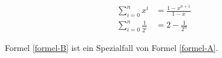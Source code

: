 \begin{align}
	\sum_{i=0}^{n} x^i &= \frac{1-x^{n+1}}{1-x} \label{formel-A} \\
	\sum_{i=0}^{n} \frac{1}{2^i} &= 2 - \frac{1}{2^n} \label{formel-B}
\end{align}

Formel \eqref{formel-B} ist ein Spezialfall von Formel \eqref{formel-A}.